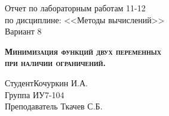 \begin{titlepage}
\newpage



\begin{center}
\Large Отчет по лабораторным работам 11-12 \\ по дисциплине: <<Методы вычислений>> \\ Вариант 8
\end{center}

\vspace{12em}

\begin{center}
\textsc{\textbf{Минимизация функций двух переменных \\при наличии ограничений.}}
\end{center}

\vspace{27em}

\begin{flushleft}
Студент\hrulefill Кочуркин И.А. \\
\vspace{1.5em}
Группа \hrulefill ИУ7-104\\
\vspace{1.5em}
Преподаватель \hrulefill Ткачев С.Б.\\
\vspace{1.5em}
\end{flushleft}

\vspace{13em}

\end{titlepage}
